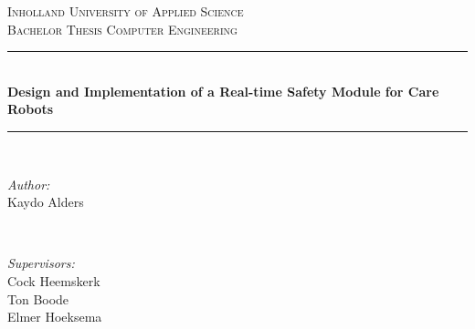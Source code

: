 \documentclass[12pt]{scrreprt}
\begin{document}
\begin{titlepage}

\newcommand{\HRule}{\rule{\linewidth}{0.5mm}} %

\center %
 

\textsc{\Large Inholland University of Applied Science}\\[1.5cm] %
\textsc{Bachelor Thesis Computer Engineering}\\[0.5cm] %


\HRule \\[0.4cm]
{ \LARGE \bfseries Design and Implementation of a Real-time Safety Module for Care Robots}\\[0.4cm] %
\HRule \\[1.5cm]
 

\begin{minipage}{0.4\textwidth}
\begin{flushleft} \large
\emph{Author:}\\
Kaydo Alders %
\end{flushleft}
\end{minipage}
~
\begin{minipage}{0.4\textwidth}
\begin{flushright} \large
\emph{Supervisors:} \\
Cock Heemskerk \\ %
Ton Boode\\ %
Elmer Hoeksema \\ %
\end{flushright}
\end{minipage}\\[2cm]


\end{titlepage}
\end{document}
